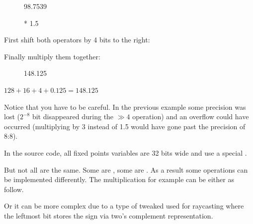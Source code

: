\par
\begin{figure}[H]
 \centering
   
   \caption{98.7539} 
\end{figure} 
\par
\begin{figure}[H]
 \centering
   
   \caption{* 1.5} 
\end{figure} 
\par
First shift both operators by 4 bits to the right:\\
\par
\begin{figure}[H]
 \centering
   
\end{figure} 
\par
\begin{figure}[H]
 \centering
   
\end{figure} 
\par

Finally multiply them together:

\begin{figure}[H]
 \centering
   
   \caption{148.125} 
\end{figure} 
$128 + 16 + 4 + 0.125 = 148.125 $\\
\par
Notice that you have to be careful. In the previous example some precision was lost ($ 2^{-8}$ bit disappeared during the $\gg 4$ operation) and an overflow could have occurred (multiplying by 3 instead of 1.5 would have gone past the precision of 8:8).\\
\par
In the source code, all fixed points variables are 32 bits wide and use a special .\\
\par
\begin{minipage}{\textwidth}
 
 \end{minipage}
\par
But not all  are the same. Some are , some are . As a result some operations can be implemented differently. The multiplication for example can be either as follow.\\
\par
\begin{minipage}{\textwidth}
 
 \end{minipage}
\par
Or it can be more complex due to a type of tweaked  used for raycasting where the leftmost bit stores the sign via two's complement representation.\\
\par
\begin{minipage}{\textwidth}
 
 \end{minipage}
\par


